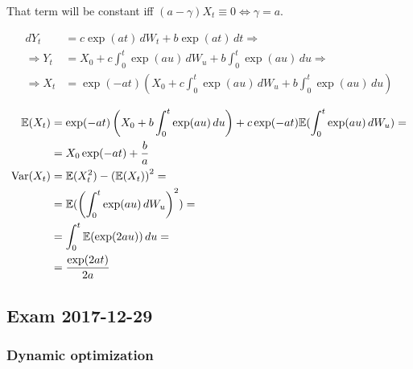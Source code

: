 \documentclass[12pt, a4paper]{article}
\begin{document}
\begin{enumerate}
That term will be constant iff $(a-\gamma) X_t \equiv 0 \Leftrightarrow \gamma = a$.

\begin{align*}
dY_t &= c \exp(at) \,dW_t + b \exp(at) \,dt \Rightarrow\\
\Rightarrow Y_t &= X_0 + c \int_{0}^{t} \exp(au) \,dW_u + b \int_{0}^{t} \exp(au) \,du \Rightarrow\\
\Rightarrow X_t &= \exp(-at) \left(X_0 + c \int_{0}^{t} \exp(au) \,dW_u + b \int_{0}^{t} \exp(au) \,du\right)
\end{align*}


\begin{align*}
	\mathbb{E}(X_t) &= \exp(-at) \left(X_0 + b \int_{0}^{t} \exp(au) \,du\right) + c \exp(-at) \mathbb{E}(\int_{0}^{t} \exp(au) \,dW_u) =\\
&= X_0 \exp(-at) + \frac{b}{a}\\
	\operatorname{Var}(X_t) &= \mathbb{E}(X_t^2) - \left(\mathbb{E}(X_t)\right)^2 =\\
		 &= \mathbb{E}(\left(\int_{0}^{t} \exp(au) \,dW_u\right)^2) =\\
   &= \int_{0}^{t} \mathbb{E}(\exp(2au)) \,du =\\
&= \frac{\exp(2at)}{2a}
\end{align*}


\end{enumerate}


\subsection{Exam 2017-12-29}

\subsubsection{Dynamic optimization}
\end{document}
